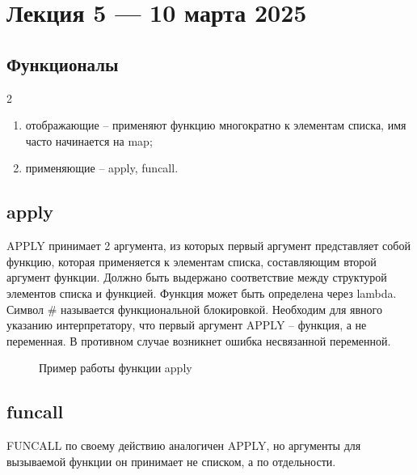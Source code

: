 \chapter{Лекция 5 — 10 марта 2025}

\section{Функционалы}

\begin{listbox}{\noindent \begin{listboxtitle}{}2\end{listboxtitle} 
	\raisebox{6pt}{Функционалы делятся на два типа:}}
\begin{enumerate}
	\item отображающие -- применяют функцию многократно к 
    элементам списка, имя часто начинается на map;
	\item применяющие -- apply, funcall.
\end{enumerate}
\end{listbox}

\section{apply}

APPLY принимает 2 аргумента, из которых первый аргумент представляет 
собой функцию, которая применяется к элементам списка, составляющим 
второй аргумент функции. Должно быть выдержано соответствие между
структурой элементов списка и функцией.  Функция может быть
определена через lambda. Символ \# называется 
функциональной блокировкой. Необходим для явного указанию 
интерпретатору, что первый аргумент APPLY -- функция, а не переменная.
В противном случае возникнет ошибка несвязанной переменной.

\begin{figure}[H]
    \begin{listingbox}{}
        
    \end{listingbox}
    \caption{Пример работы функции apply}
    \label{lst:apply-example}
\end{figure}

\section{funcall}

FUNCALL по своему действию аналогичен APPLY, но аргументы для вызываемой 
функции он принимает не списком, а по отдельности.

